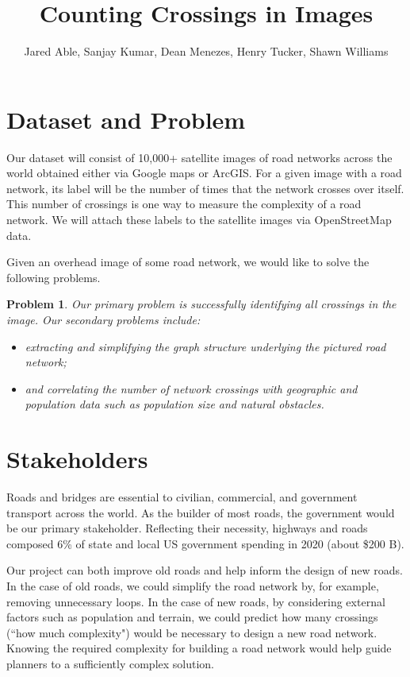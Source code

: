 \documentclass{article}
\newtheorem*{problem}{Problem}
\begin{document}
	

		\title{Counting Crossings in Images}
		\author{Jared Able, Sanjay Kumar, Dean Menezes, Henry Tucker, Shawn Williams}
		\date{}
\maketitle
		

	
	\section{Dataset and Problem}
	
	Our dataset will consist of 10,000+ satellite images of road networks across the world obtained either via Google maps or ArcGIS. For a given image with a road network, its label will be the number of times that the network crosses over itself. This number of crossings is one way to measure the complexity of a road network. We will attach these labels to the satellite images via OpenStreetMap data. 
	
	Given an overhead image of some road network, we would like to solve the following problems.
	
	\begin{problem}
			Our primary problem is successfully identifying all crossings in the image. Our secondary problems include:
			\begin{itemize}
				\item extracting and simplifying the graph structure underlying the pictured road network;
				\item and correlating the number of network crossings with geographic and population data such as population size and natural obstacles.
			\end{itemize}
		\end{problem}
		
		

	
	\section{Stakeholders}
	
	Roads and bridges are essential to civilian, commercial, and government transport across the world. As the builder of most roads, the government would be our primary stakeholder. Reflecting their necessity, highways and roads composed 6\% of state and local US government spending in 2020 (about \$200 B). 
	
	
	Our project can both improve old roads and help inform the design of new roads. In the case of old roads, we could simplify the road network by, for example, removing unnecessary loops. In the case of new roads, by considering external factors such as population and terrain, we could predict how many crossings (``how much complexity") would be necessary to design a new road network. Knowing the required complexity for building a road network would help guide planners to a sufficiently complex solution.
	
\end{document}
